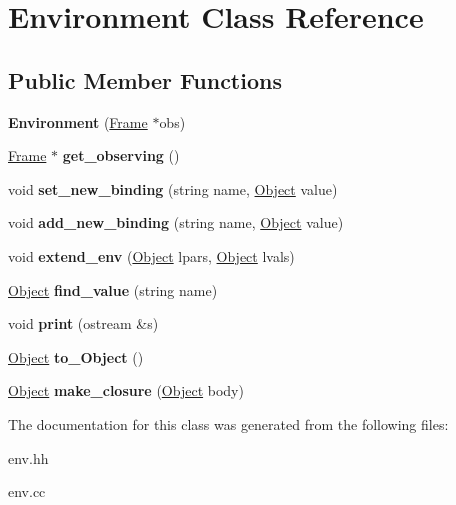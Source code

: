 \hypertarget{classEnvironment}{\section{Environment Class Reference}
\label{classEnvironment}
}
\subsection*{Public Member Functions}
\begin{DoxyCompactItemize}
\item 
\hypertarget{classEnvironment_acdb77ec0b3bc9b6b48ce430a8ff8d16d}{{\bfseries Environment} (\hyperlink{classFrame}{Frame} $\ast$obs)}\label{classEnvironment_acdb77ec0b3bc9b6b48ce430a8ff8d16d}

\item 
\hypertarget{classEnvironment_a73a2cb3642111c86485f48e70e5e4870}{\hyperlink{classFrame}{Frame} $\ast$ {\bfseries get\-\_\-observing} ()}\label{classEnvironment_a73a2cb3642111c86485f48e70e5e4870}

\item 
\hypertarget{classEnvironment_adac8db22e668d2a78a2cc18d0528c396}{void {\bfseries set\-\_\-new\-\_\-binding} (string name, \hyperlink{classCell}{Object} value)}\label{classEnvironment_adac8db22e668d2a78a2cc18d0528c396}

\item 
\hypertarget{classEnvironment_aaa7f24d4804dd8e2e9e95506b7c5bf58}{void {\bfseries add\-\_\-new\-\_\-binding} (string name, \hyperlink{classCell}{Object} value)}\label{classEnvironment_aaa7f24d4804dd8e2e9e95506b7c5bf58}

\item 
\hypertarget{classEnvironment_a29feed86a6e592d20f8c8882fcd35d6c}{void {\bfseries extend\-\_\-env} (\hyperlink{classCell}{Object} lpars, \hyperlink{classCell}{Object} lvals)}\label{classEnvironment_a29feed86a6e592d20f8c8882fcd35d6c}

\item 
\hypertarget{classEnvironment_aaa0fcf257cf27f961e51a9602cc2cb48}{\hyperlink{classCell}{Object} {\bfseries find\-\_\-value} (string name)}\label{classEnvironment_aaa0fcf257cf27f961e51a9602cc2cb48}

\item 
\hypertarget{classEnvironment_a61952d5ef784bff91ce1a66d6a00dc99}{void {\bfseries print} (ostream \&s)}\label{classEnvironment_a61952d5ef784bff91ce1a66d6a00dc99}

\item 
\hypertarget{classEnvironment_ace71e43a313cdeefb1e445ecef61825b}{\hyperlink{classCell}{Object} {\bfseries to\-\_\-\-Object} ()}\label{classEnvironment_ace71e43a313cdeefb1e445ecef61825b}

\item 
\hypertarget{classEnvironment_a852ae1aa43ba278c27a91e8dcc968086}{\hyperlink{classCell}{Object} {\bfseries make\-\_\-closure} (\hyperlink{classCell}{Object} body)}\label{classEnvironment_a852ae1aa43ba278c27a91e8dcc968086}

\end{DoxyCompactItemize}


The documentation for this class was generated from the following files\-:\begin{DoxyCompactItemize}
\item 
env.\-hh\item 
env.\-cc\end{DoxyCompactItemize}
